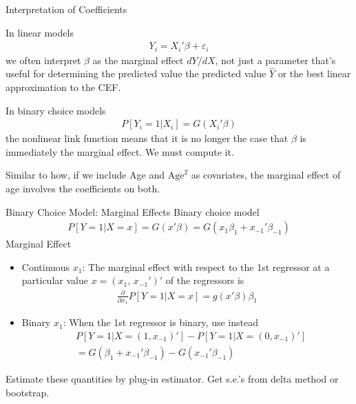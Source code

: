 \documentclass[aspectratio=169, handout]{beamer}
\begin{document}
{\footnotesize
\begin{frame}{Interpretation of Coefficients}

In linear models
\begin{align*}
  Y_i = X_i'\beta + \varepsilon_i
\end{align*}
we often interpret $\beta$ as the \alert{marginal effect} $dY/dX$, not
just a parameter that's useful for determining the predicted value
the predicted value $\hat{Y}$ or the best linear approximation to the
CEF.

In binary choice models
\begin{align*}
  P[Y_i=1|X_i]
  =
  G(X_i'\beta)
\end{align*}
the nonlinear link function means that it is no longer the case that
$\beta$ is immediately the marginal effect.
We must compute it.

Similar to how, if we include Age and $\text{Age}^2$ as covariates, the
marginal effect of age involves the coefficients on both.
\end{frame}
}


{\footnotesize
\begin{frame}{Binary Choice Model: Marginal Effects}
Binary choice model
\begin{align*}
  P[Y=1|X=x]
  =
  G(x'\beta)
  =
  G(x_1\beta_{1} + x_{-1}'\beta_{-1})
\end{align*}
\alert{Marginal Effect}
\begin{itemize}
  \item \alert{Continuous $x_1$}:
    The marginal effect with respect to the 1st regressor at a
    particular value $x=(x_1,\,x_{-1}')'$ of the regressors is
    \begin{align*}
      \frac{\partial}{\partial x_1}
      P[Y=1|X=x]
      =
      g(x'\beta)\beta_{1}
    \end{align*}

  \item \alert{Binary $x_1$}:
    When the 1st regressor is binary, use instead
    \begin{align*}
      &
      P[Y=1|X=(1,x_{-1})']
      -
      P[Y=1|X=(0,x_{-1})']
      \\
      &=
      G(\beta_{1} + x_{-1}'\beta_{-1})
      -
      G(x_{-1}'\beta_{-1})
    \end{align*}

\end{itemize}
Estimate these quantities by plug-in estimator.
Get s.e.'s from delta method or bootstrap.
\end{frame}
}
\end{document}
